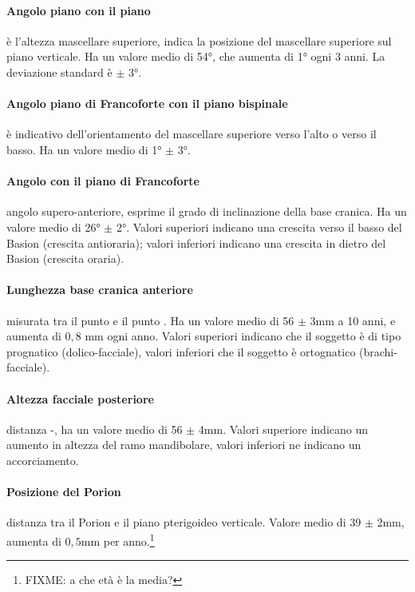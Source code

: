 \paragraph{Angolo piano  con il piano } è l'altezza mascellare superiore, indica la posizione del mascellare superiore sul piano verticale. Ha un valore medio di 54°, che aumenta di 1° ogni 3 anni. La deviazione standard è $\pm$ 3°.

\paragraph{Angolo piano di Francoforte con il piano bispinale} è indicativo dell'orientamento del mascellare superiore verso l'alto o verso il basso. Ha un valore medio di 1° $\pm$ 3°.

\paragraph{Angolo  con il piano di Francoforte} angolo supero-anteriore, esprime il grado di inclinazione della base cranica. Ha un valore medio di 26° $\pm$ 2°. Valori superiori indicano una crescita verso il basso del Basion (crescita antioraria); valori inferiori indicano una crescita in dietro del Basion (crescita oraria).

\paragraph{Lunghezza base cranica anteriore} misurata tra il punto  e il punto . Ha un valore medio di 56 $\pm$ 3mm a 10 anni, e aumenta di $0,8$ mm ogni anno. Valori superiori indicano che il soggetto è di tipo prognatico (dolico-facciale), valori inferiori che il soggetto è ortognatico (brachi-facciale).

\paragraph{Altezza facciale posteriore} distanza -, ha un valore medio di 56 $\pm$ 4mm. Valori superiore indicano un aumento in altezza del ramo mandibolare, valori inferiori ne indicano un accorciamento.

\paragraph{Posizione del Porion} distanza tra il Porion e il piano pterigoideo verticale. Valore medio di 39 $\pm$ 2mm, aumenta di $0,5$mm per anno.\footnote{FIXME: a che età è la media?}

